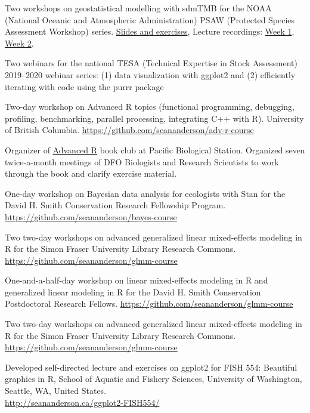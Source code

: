 \begin{description}
\tightlist
\item[2022]
Two workshops on geostatistical modelling with sdmTMB for the NOAA
(National Oceanic and Atmospheric Administration) PSAW (Protected
Species Assessment Workshop) series.
\href{https://pbs-assess.github.io/sdmTMB-teaching/noaa-psaw-2022/}{Slides
and exercises}, Lecture recordings:
\href{https://youtu.be/DIXa7ngVVL0}{Week 1},
\href{https://youtu.be/VxnqgiAAjfk}{Week 2}.
\item[2020]
Two webinars for the national TESA (Technical Expertise in Stock
Assessment) 2019--2020 webinar series: (1) data visualization with
ggplot2 and (2) efficiently iterating with code using the purrr package
\item[2019]
Two-day workshop on Advanced R topics (functional programming,
debugging, profiling, benchmarking, parallel processing, integrating C++
with R). University of British Columbia.
\url{https://github.com/seananderson/adv-r-course}
\item[2019]
Organizer of \href{https://adv-r.hadley.nz/}{Advanced R} book club at
Pacific Biological Station. Organized seven twice-a-month meetings of
DFO Biologists and Research Scientists to work through the book and
clarify exercise material.
\item[2018]
One-day workshop on Bayesian data analysis for ecologists with Stan for
the David H. Smith Conservation Research Fellowship Program.
\url{https://github.com/seananderson/bayes-course}
\item[2018]
Two two-day workshops on advanced generalized linear mixed-effects
modeling in R for the Simon Fraser University Library Research Commons.
\url{https://github.com/seananderson/glmm-course}
\item[2017]
One-and-a-half-day workshop on linear mixed-effects modeling in R and
generalized linear modeling in R for the David H. Smith Conservation
Postdoctoral Research Fellows.
\url{https://github.com/seananderson/glmm-course}
\item[2016]
Two two-day workshops on advanced generalized linear mixed-effects
modeling in R for the Simon Fraser University Library Research Commons.
\url{https://github.com/seananderson/glmm-course}
\item[2014--16]
Developed self-directed lecture and exercises on ggplot2 for FISH 554:
Beautiful graphics in R, School of Aquatic and Fishery Sciences,
University of Washington, Seattle, WA, United States.\\
\url{http://seananderson.ca/ggplot2-FISH554/}

\end{description}
